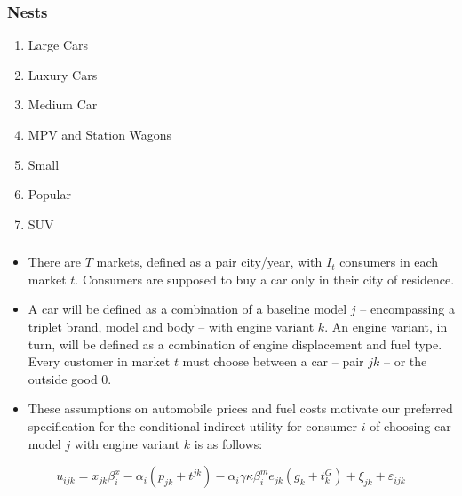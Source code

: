 \documentclass{beamer}
\begin{document}
\begin{frame}[fragile]\frametitle{Nests}
    
\begin{enumerate}
\item Large Cars
\item Luxury Cars
\item Medium Car
\item MPV and Station Wagons
\item Small
\item Popular
\item SUV
\end{enumerate}


\end{frame}

\begin{frame}[fragile]\frametitle{\insertsection}
\begin{itemize}
    \item There are $T$ markets, defined as a pair city/year, with $I_t$ consumers in each market $t$. Consumers are supposed to buy a car only in their city of residence.
    \item A car will be defined as a combination of a baseline model $j$ -- encompassing a triplet brand, model and body -- with engine variant $k$. An engine variant, in turn, will be defined as a combination of engine displacement and fuel type. Every customer in market $t$ must choose between a car -- pair $jk$ -- or the outside good $0$.
    \item These assumptions on automobile prices and fuel costs motivate our preferred specification for the conditional indirect utility for consumer $i$ of choosing car model $j$ with engine variant $k$ is as follows: 
\end{itemize}
\begin{equation}
u_{ijk}=x_{jk}\beta_{i}^{x}-\alpha_{i}(p_{jk}+t^{jk})-\alpha_{i}\gamma \kappa \beta_{i}^{m} e_{jk} (g_{k}+t_{k}^{G})+\xi_{jk}+\varepsilon_{ijk}
\end{equation}

\end{frame}
\end{document}
